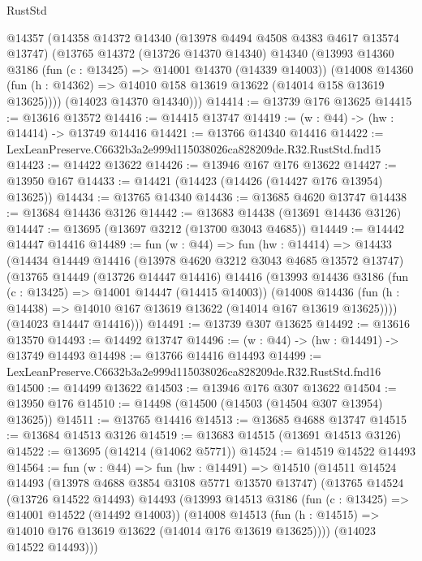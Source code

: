 \begin{lexlean}{RustStd}
\begin{coremodule}
  @14357
    (@14358
      @14372
      @14340
      (@13978 @4494 @4508 @4383 @4617 @13574 @13747)
      (@13765
        @14372
        (@13726 @14370 @14340)
        @14340
        (@13993
          @14360
          @3186
          (fun (c : @13425) => @14001 @14370 (@14339 @14003))
          (@14008
            @14360
            (fun (h : @14362) => @14010 @158 @13619 @13622 (@14014 @158 @13619 @13625))))
        (@14023 @14370 @14340)))
@14414 := @13739 @176 @13625
@14415 := @13616 @13572
@14416 := @14415 @13747
@14419 := (w : @44) -> (hw : @14414) -> @13749 @14416
@14421 := @13766 @14340 @14416
@14422 := LexLeanPreserve.C6632b3a2e999d115038026ca828209de.R32.RustStd.fnd15
@14423 := @14422 @13622
@14426 := @13946 @167 @176 @13622
@14427 := @13950 @167
@14433 := @14421 (@14423 (@14426 (@14427 @176 @13954) @13625))
@14434 := @13765 @14340
@14436 := @13685 @4620 @13747
@14438 := @13684 @14436 @3126
@14442 := @13683 @14438 (@13691 @14436 @3126)
@14447 := @13695 (@13697 @3212 (@13700 @3043 @4685))
@14449 := @14442 @14447 @14416
@14489 := fun (w : @44) =>
  fun (hw : @14414) =>
  @14433
    (@14434
      @14449
      @14416
      (@13978 @4620 @3212 @3043 @4685 @13572 @13747)
      (@13765
        @14449
        (@13726 @14447 @14416)
        @14416
        (@13993
          @14436
          @3186
          (fun (c : @13425) => @14001 @14447 (@14415 @14003))
          (@14008
            @14436
            (fun (h : @14438) => @14010 @167 @13619 @13622 (@14014 @167 @13619 @13625))))
        (@14023 @14447 @14416)))
@14491 := @13739 @307 @13625
@14492 := @13616 @13570
@14493 := @14492 @13747
@14496 := (w : @44) -> (hw : @14491) -> @13749 @14493
@14498 := @13766 @14416 @14493
@14499 := LexLeanPreserve.C6632b3a2e999d115038026ca828209de.R32.RustStd.fnd16
@14500 := @14499 @13622
@14503 := @13946 @176 @307 @13622
@14504 := @13950 @176
@14510 := @14498 (@14500 (@14503 (@14504 @307 @13954) @13625))
@14511 := @13765 @14416
@14513 := @13685 @4688 @13747
@14515 := @13684 @14513 @3126
@14519 := @13683 @14515 (@13691 @14513 @3126)
@14522 := @13695 (@14214 (@14062 @5771))
@14524 := @14519 @14522 @14493
@14564 := fun (w : @44) =>
  fun (hw : @14491) =>
  @14510
    (@14511
      @14524
      @14493
      (@13978 @4688 @3854 @3108 @5771 @13570 @13747)
      (@13765
        @14524
        (@13726 @14522 @14493)
        @14493
        (@13993
          @14513
          @3186
          (fun (c : @13425) => @14001 @14522 (@14492 @14003))
          (@14008
            @14513
            (fun (h : @14515) => @14010 @176 @13619 @13622 (@14014 @176 @13619 @13625))))
        (@14023 @14522 @14493)))

\end{coremodule}
\end{lexlean}
